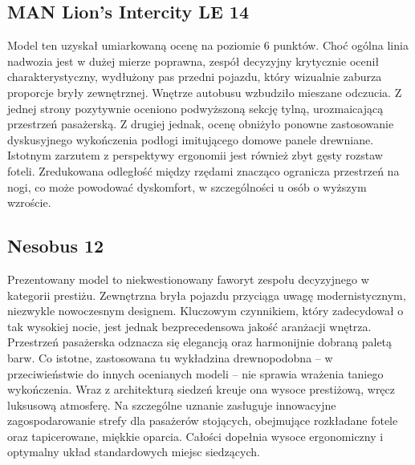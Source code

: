 \subsection{MAN Lion's Intercity LE 14}
Model ten uzyskał umiarkowaną ocenę na poziomie 6 punktów. Choć ogólna linia nadwozia jest w dużej mierze poprawna, zespół decyzyjny krytycznie ocenił charakterystyczny, wydłużony pas przedni pojazdu, który wizualnie zaburza proporcje bryły zewnętrznej. Wnętrze autobusu wzbudziło mieszane odczucia. Z jednej strony pozytywnie oceniono podwyższoną sekcję tylną, urozmaicającą przestrzeń pasażerską. Z drugiej jednak, ocenę obniżyło ponowne zastosowanie dyskusyjnego wykończenia podłogi imitującego domowe panele drewniane. Istotnym zarzutem z perspektywy ergonomii jest również zbyt gęsty rozstaw foteli. Zredukowana odległość między rzędami znacząco ogranicza przestrzeń na nogi, co może powodować dyskomfort, w szczególności u osób o wyższym wzroście.

\subsection{Nesobus 12}
Prezentowany model to niekwestionowany faworyt zespołu decyzyjnego w kategorii prestiżu. Zewnętrzna bryła pojazdu przyciąga uwagę modernistycznym, niezwykle nowoczesnym designem. Kluczowym czynnikiem, który zadecydował o tak wysokiej nocie, jest jednak bezprecedensowa jakość aranżacji wnętrza. Przestrzeń pasażerska odznacza się elegancją oraz harmonijnie dobraną paletą barw. Co istotne, zastosowana tu wykładzina drewnopodobna – w przeciwieństwie do innych ocenianych modeli – nie sprawia wrażenia taniego wykończenia. Wraz z architekturą siedzeń kreuje ona wysoce prestiżową, wręcz luksusową atmosferę. Na szczególne uznanie zasługuje innowacyjne zagospodarowanie strefy dla pasażerów stojących, obejmujące rozkładane fotele oraz tapicerowane, miękkie oparcia. Całości dopełnia wysoce ergonomiczny i optymalny układ standardowych miejsc siedzących.

